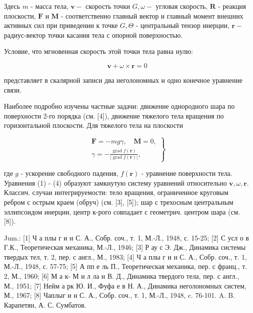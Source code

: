\documentclass[10pt]{article}
\begin{document}
Здесь $m$ - масса тела, $\boldsymbol{v}-$ скорость точки $G, \omega-$ угловая скорость, $\boldsymbol{R}$ - реакция плоскости, $\boldsymbol{F}$ и $\boldsymbol{M}$ - соответственно главный вектор и главный момент внешних активных сил при приведении к точке $G, \Theta$ - центральный тензор инерции, $\boldsymbol{r}-$ радиус-вектор точки касания тела с опорной поверхностью.



Условие, что мгновенная скорость этой точки тела равна нулю:



\[

\boldsymbol{v}+\omega \times \boldsymbol{r}=0

\]



представляет в скалярной записи два неголономных и одно конечное уравнение связи.



Наиболее подробно изучены частные задачи: движение однородного шара по поверхности 2-го порядка (см. [4]), движение тяжелого тела вращения по горизонтальной плоскости. Для тяжелого тела на плоскости



\[

\left.\begin{array}{l}

\boldsymbol{F}=-m g \gamma, \quad \boldsymbol{M}=0, \\

\gamma=-\frac{\operatorname{grad} f(\boldsymbol{r})}{|\operatorname{grad} f(\boldsymbol{r})|},

\end{array}\right\}

\]



где $g$ - ускорение свободного падения, $f(\boldsymbol{r})$ - уравнение поверхности тела. Уравнения (1) - (4) образуют замкнутую систему уравнений относительно $\boldsymbol{v}, \omega, \boldsymbol{r}$. Классич. случаи интегрируемости: тело вращения, ограниченное круговым ребром с острым краем (обруч) (см. [3], [5]); шар с трехосным центральным эллипсоидом инерции, центр к-рого совпадает с геометрич. центром шара (см. [8]).



Jum.: [1] Ч а плы г и н С. А., Собр. соч., т. 1, М.-Л., 1948, с. 15-25; [2] С усл о в Г.К., Теоретическая механика, М.-Л., 1946; [3] Р ау с Э. Дж., Динамика системы твердых тел, т. 2, пер. с англ., М., 1983; [4] Ч а плы г и н С. А., Собр. соч., т. 1, М.-Л., 1948, с. 57-75; [5] А пп е ль П., Теоретическая механика, пер. с франц., т. 2, М., 1960; [6] М а к- М и л ла н В. Д., Динамика твердого тела, пер. с англ., М., 1951; [7] Нейм а рк Ю. И., Фуфа е в Н. А., Динамика неголономных систем, М., 1967; [8] Чаплыг и н С. А., Собр. соч., т. 1, М.-Л., 1948, c. 76-101. A. B. Карапетян, А. С. Сумбатов.
\end{document}
